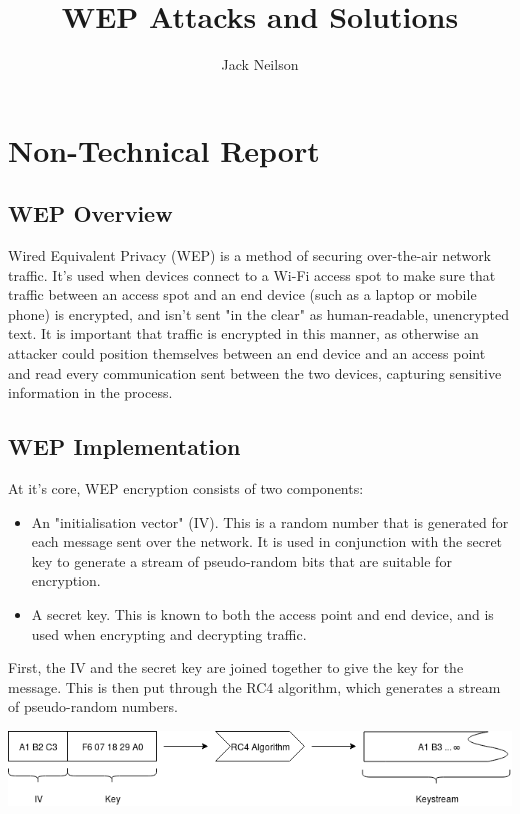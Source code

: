 \documentclass[12pt]{article}
\begin{document}
\title{WEP Attacks and Solutions}
\author{Jack Neilson}
\maketitle

\tableofcontents
\newpage

\section{Non-Technical Report}
\subsection{WEP Overview}
Wired Equivalent Privacy (WEP) is a method of securing over-the-air network traffic. It's used when devices connect to a Wi-Fi access spot to make sure that traffic between an access spot and an end device (such as a laptop or mobile phone) is encrypted, and isn't sent "in the clear" as human-readable, unencrypted text. It is important that traffic is encrypted in this manner, as otherwise an attacker could position themselves between an end device and an access point and read every communication sent between the two devices, capturing sensitive information in the process.

\subsection{WEP Implementation}
At it's core, WEP encryption consists of two components:

\begin{itemize}
\item{An "initialisation vector" (IV). This is a random number that is generated for each message sent over the network. It is used in conjunction with the secret key to generate a stream of pseudo-random bits that are suitable for encryption.} 

\item{A secret key. This is known to both the access point and end device, and is used when encrypting and decrypting traffic.}
\end{itemize}

First, the IV and the secret key are joined together to give the key for the message. This is then put through the RC4 algorithm, which generates a stream of pseudo-random numbers.

\vspace{6px}
\centerline{\includegraphics[width=\linewidth]{res/keystream.png}}
\vspace{6px}
\end{document}
